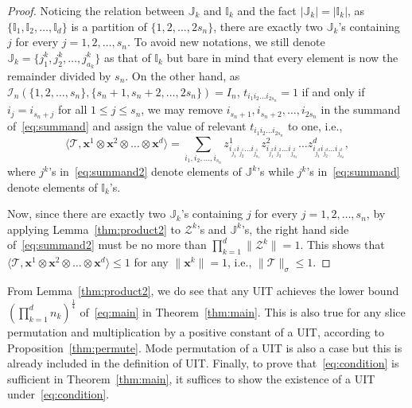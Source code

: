 \documentclass[11pt]{article}
\newcommand{\BI}{\mathbb{I}}
\newcommand{\BJ}{\mathbb{J}}
\newcommand{\Z}{\mathcal{Z}}
\newcommand{\II}{\mathcal{I}}
\newcommand{\TT}{\mathcal{T}}
\newcommand{\bx}{\boldsymbol{x}}
\begin{document}
\begin{proof}
Noticing the relation between $\BJ_k$ and $\BI_k$ and the fact $|\BJ_k|=|\BI_k|$, as $\{\BI_1,\BI_2,\dots,\BI_d\}$ is a partition of $\{1,2,\dots,2s_n\}$, there are exactly two $\BJ_k$'s containing $j$ for every $j=1,2,\dots,s_n$. To avoid new notations, we still denote $\BJ_k=\{j^k_1,j^k_2,\dots,j^k_{a_k}\}$ as that of $\BI_k$ but bare in mind that every element is now the remainder divided by $s_n$. On the other hand, as $\II_n\left(\{1,2,\dots,s_n\},\{s_n+1,s_n+2,\dots,2s_n\}\right)=I_n$, $t_{i_1i_2\dots i_{2s_n}}=1$ if and only if $i_j=i_{s_n+j}$ for all $1\le j\le s_n$, we may remove $i_{s_n+1},i_{s_n+2},\dots,i_{2s_n}$ in the summand of~\eqref{eq:summand} and assign the value of relevant $t_{i_1i_2\dots i_{2s_n}}$ to one, i.e.,
\begin{equation} \label{eq:summand2}
\langle \TT,\bx^1\otimes\bx^2\otimes\dots\otimes \bx^d \rangle
=\sum_{i_1,i_2,\dots,i_{s_n}} z^{1}_{i_{j^1_1} i_{j^1_2}\dots i_{j^1_{a_1}}} z^{2}_{i_{j^2_1} i_{j^2_2}\dots i_{j^2_{a_2}}} \dots z^{d}_{i_{j^d_1} i_{j^d_2} \dots i_{j^d_{a_d}}},
\end{equation}
where $j^k$'s in~\eqref{eq:summand2} denote elements of $\BJ^k$'s while $j^k$'s in~\eqref{eq:summand} denote elements of $\BI_k$'s.

Now, since there are exactly two $\BJ_k$'s containing $j$ for every $j=1,2,\dots,s_n$, by applying Lemma~\ref{thm:product2} to $\Z^k$'s and $\BJ^k$'s, the right hand side of~\eqref{eq:summand2} must be no more than $\prod_{k=1}^d\|\Z^k\|=1$. This shows that $\langle \TT,\bx^1\otimes\bx^2\otimes\dots\otimes \bx^d \rangle\le1$ for any $\|\bx^k\|=1$, i.e., $\|\TT\|_\sigma\le1$.
\end{proof}

From Lemma~\ref{thm:product2}, we do see that any UIT achieves the lower bound $\left(\prod_{k=1}^d n_k\right)^{\frac{1}{4}}$ of~\eqref{eq:main} in Theorem~\ref{thm:main}. This is also true for any slice permutation and multiplication by a positive constant of a UIT, according to Proposition~\ref{thm:permute}. Mode permutation of a UIT is also a case but this is already included in the definition of UIT. Finally, to prove that~\eqref{eq:condition} is sufficient in Theorem~\ref{thm:main}, it suffices to show the existence of a UIT under~\eqref{eq:condition}.
\end{document}
